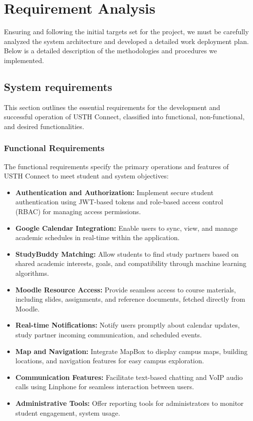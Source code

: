 \documentclass[12pt]{article}
\begin{document}
\pagebreak

\section{Requirement Analysis}
Ensuring and following the initial targets set for the project, we must be carefully analyzed the system
architecture and developed a detailed work deployment plan. Below is a detailed description of
the methodologies and procedures we implemented.

\subsection{System requirements}
This section outlines the essential requirements for the development and successful operation of USTH Connect, classified into functional, non-functional, and desired functionalities.  

\subsubsection{Functional Requirements}
The functional requirements specify the primary operations and features of USTH Connect to meet student and system objectives:  
\begin{itemize}  
    \item \textbf{Authentication and Authorization:} Implement secure student authentication using JWT-based tokens and role-based access control (RBAC) for managing access permissions.  
    \item \textbf{Google Calendar Integration:} Enable users to sync, view, and manage academic schedules in real-time within the application.  
    \item \textbf{StudyBuddy Matching:} Allow students to find study partners based on shared academic interests, goals, and compatibility through machine learning algorithms.  
    \item \textbf{Moodle Resource Access:} Provide seamless access to course materials, including slides, assignments, and reference documents, fetched directly from Moodle.  
    \item \textbf{Real-time Notifications:} Notify users promptly about calendar updates, study partner incoming communication, and scheduled events.  
    \item \textbf{Map and Navigation:} Integrate MapBox to display campus maps, building locations, and navigation features for easy campus exploration.  
    \item \textbf{Communication Features:} Facilitate text-based chatting and VoIP audio calls using Linphone for seamless interaction between users.  
    \item \textbf{Administrative Tools:} Offer reporting tools for administrators to monitor student engagement, system usage.  
\end{itemize} 
\end{document}
